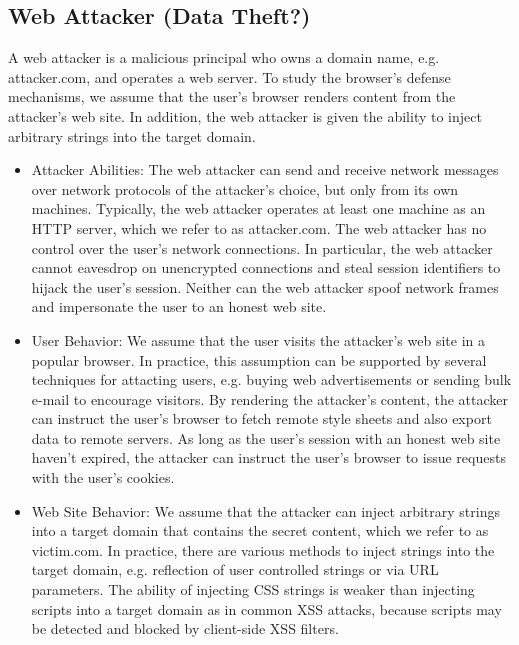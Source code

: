 \documentclass{acm_proc_article-sp}
\begin{document}
\subsection*{Web Attacker (Data Theft?)}
A web attacker is a malicious principal who owns a domain name, e.g. attacker.com, and operates a web server. To study the browser's defense mechanisms, we assume that the user's browser renders content from the attacker's web site. In addition, the web attacker is given the ability to inject arbitrary strings into the target domain.

\begin{itemize}

\item{Attacker Abilities:}
The web attacker can send and receive network messages over network protocols of the attacker's choice, but only from its own machines. Typically, the web attacker operates at least one machine as an HTTP server, which we refer to as attacker.com. The web attacker has no control over the user's network connections. In particular, the web attacker cannot eavesdrop on unencrypted connections and steal session identifiers to hijack the user's session. Neither can the web attacker spoof network frames and impersonate the user to an honest web site.

\item{User Behavior:}
We assume that the user visits the attacker's web site in a popular browser. In practice, this assumption can be supported by several techniques for attacting users, e.g. buying web advertisements or sending bulk e-mail to encourage visitors. By rendering the attacker's content, the attacker can instruct the user's browser to fetch remote style sheets and also export data to remote servers. As long as the user's session with an honest web site haven't expired, the attacker can instruct the user's browser to issue requests with the user's cookies.

\item{Web Site Behavior:}
We assume that the attacker can inject arbitrary strings into a target domain that contains the secret content, which we refer to as victim.com. In practice, there are various methods to inject strings into the target domain, e.g. reflection of user controlled strings or via URL parameters. The ability of injecting CSS strings is weaker than injecting scripts into a target domain as in common XSS attacks, because scripts may be detected and blocked by client-side XSS filters.

\end{itemize}
\end{document}
